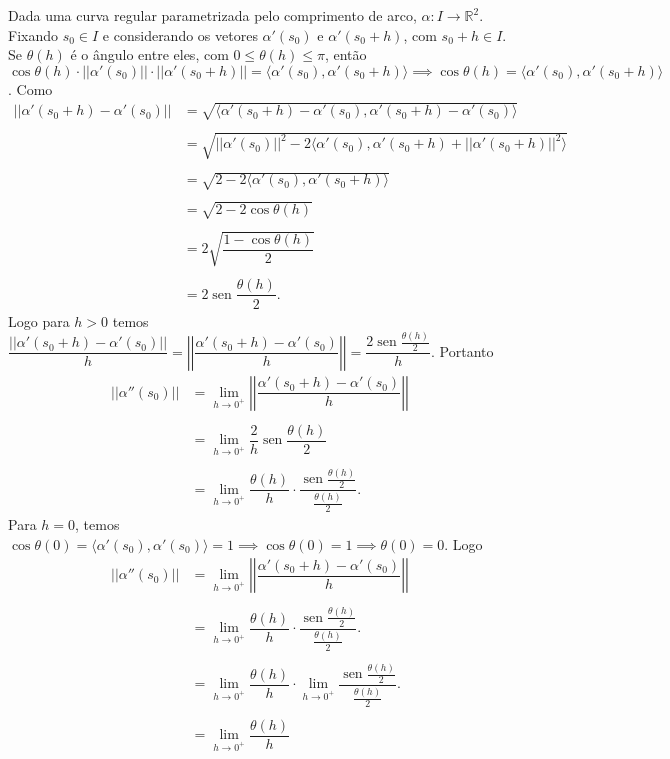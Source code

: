 \documentclass[12pt,leqno,twoside]{amsart}
\theoremstyle{definition}
\newcommand{\sen}{\operatorname{sen}}
\begin{document}
	Dada uma curva regular parametrizada pelo comprimento de arco, $\alpha:I\to \mathbb{R}^2$. Fixando $s_0\in I$ e considerando os vetores $\alpha'(s_0)$ e $\alpha'(s_0+h)$, com $s_0+h\in I$. Se $\theta(h)$ é o ângulo entre eles, com $0\leq \theta(h) \leq \pi$, então $\cos \theta(h)\cdot || \alpha'(s_0)|| \cdot || \alpha'(s_0+h)|| = \langle \alpha'(s_0), \alpha'(s_0+h) \rangle \implies \cos \theta(h) =  \langle \alpha'(s_0), \alpha'(s_0+h) \rangle $. Como \begin{align*}
	||  \alpha'(s_0+h) - \alpha'(s_0) ||&= \sqrt{ \langle   \alpha'(s_0+h) - \alpha'(s_0) ,   \alpha'(s_0+h) - \alpha'(s_0)  \rangle } \\~\\
		&= \sqrt{ ||\alpha'(s_0) ||^2  -2 \langle \alpha'(s_0), \alpha'(s_0+h) + || \alpha'(s_0+h)||^2 \rangle} \\~\\
	&= \sqrt{ 2 - 2\langle \alpha'(s_0), \alpha'(s_0+h) \rangle} \\~\\
		&= \sqrt{ 2 - 2\cos \theta(h) } \\~\\
		&= 2\sqrt{\dfrac{1 - \cos \theta(h)}{2}} \\~\\
	&= 2\sen \dfrac{\theta(h)}{2}.\end{align*}
	Logo para $h>0$ temos $\dfrac{|| \alpha'(s_0 +h) - \alpha'(s_0)||}{h} = \left|\left| \dfrac{\alpha'(s_0 +h) - \alpha'(s_0)}{h}\right|\right| = \dfrac{2\sen\frac{\theta(h)}{2}}{h}$. Portanto  \begin{align*}
		|| \alpha''(s_0) || &= \lim_{h\to 0^{+}} \left|\left| \dfrac{ \alpha'(s_0 + h) - \alpha'(s_0) }{h}\right|\right| \\~\\
		&= \lim_{h\to 0^{+}} \dfrac{2}{h}\sen \dfrac{\theta(h)}{2}\\~\\
		&= \lim_{h\to 0^{+}} \dfrac{\theta(h)}{h} \cdot \dfrac{\sen \frac{\theta(h)}{2} }{ \frac{\theta(h)}{2} }.
	\end{align*}
	Para $h=0$, temos $\cos \theta(0) = \langle \alpha'(s_0),  \alpha'(s_0) \rangle  = 1 \implies \cos \theta(0) = 1 \implies \theta(0) = 0$. Logo \begin{align*}
		|| \alpha''(s_0) || &= \lim_{h\to 0^{+}} \left|\left| \dfrac{ \alpha'(s_0 + h) - \alpha'(s_0) }{h}\right|\right| \\~\\
		&= \lim_{h\to 0^{+}} \dfrac{\theta(h)}{h} \cdot \dfrac{\sen \frac{\theta(h)}{2} }{ \frac{\theta(h)}{2} }.\\~\\
		&= \lim_{h\to 0^{+}} \dfrac{\theta(h)}{h} \cdot \lim_{h\to 0^+}\dfrac{\sen \frac{\theta(h)}{2} }{ \frac{\theta(h)}{2} }.\\~\\
		&= \lim_{h\to 0^{+}} \dfrac{\theta(h)}{h}
	\end{align*}
\end{document}
